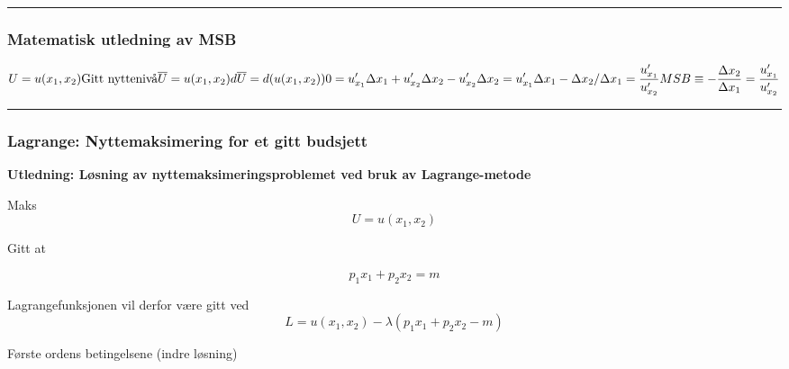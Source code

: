 \documentclass[
  letterpaper,
  DIV=11,
  numbers=noendperiod]{scrartcl}
\begin{document}
\begin{center}\rule{0.5\linewidth}{0.5pt}\end{center}

\subsubsection{Matematisk utledning av
MSB}\label{matematisk-utledning-av-msb}

\begin{equation*}
U=u(x_{1}, x_{2})  \\
\text{Gitt nyttenivå} \\
\overline{U}=u(x_{1},x_{2}) \\ 
d\overline{U}=d(u(x_{1},x_{2})) \\
0 = u'_{x_{1}}\Delta x_{1}+u'_{x_{2}}\Delta x_{2} \\
-u'_{x_{2}}\Delta x_{2}  = u'_{x_{1}}\Delta x_{1}\\
-\Delta x_{2}/\Delta x_{1}  = \frac{u'_{x_{1}}}{u'_{x_{2}}}\\
MSB\equiv - \frac{\Delta x_{2}}{\Delta x_{1}}  = \frac{u'_{x_{1}}}{u'_{x_{2}}}
\end{equation*}

\begin{center}\rule{0.5\linewidth}{0.5pt}\end{center}

\subsubsection{Lagrange: Nyttemaksimering for et gitt
budsjett}\label{lagrange-nyttemaksimering-for-et-gitt-budsjett}

\textbf{Utledning: Løsning av nyttemaksimeringsproblemet ved bruk av
Lagrange-metode}

Maks \begin{equation*}
U=u(x_{1}, x_{2}) 
\end{equation*}

Gitt at

\begin{equation*}
p_{1}x_{1}+p_{2}x_{2}=m
\end{equation*}

Lagrangefunksjonen vil derfor være gitt ved \begin{equation*}
L = u(x_{1},x_{2}) - \lambda(p_{1}x_{1}+p_{2}x_{2}-m)
\end{equation*}

Første ordens betingelsene (indre løsning)
\end{document}
